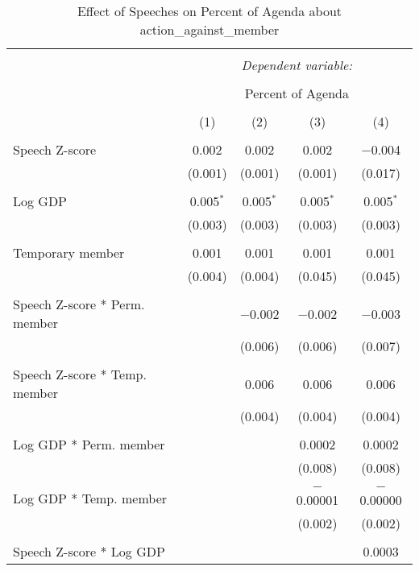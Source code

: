 
\begin{table}[!htbp] \centering 
  \caption{Effect of Speeches on Percent of Agenda about action_against_member} 
  \label{} 
\begin{tabular}{@{\extracolsep{5pt}}lcccc} 
\\[-1.8ex]\hline 
\hline \\[-1.8ex] 
 & \multicolumn{4}{c}{\textit{Dependent variable:}} \\ 
\cline{2-5} 
\\[-1.8ex] & \multicolumn{4}{c}{Percent of Agenda} \\ 
\\[-1.8ex] & (1) & (2) & (3) & (4)\\ 
\hline \\[-1.8ex] 
 Speech Z-score & 0.002 & 0.002 & 0.002 & $-$0.004 \\ 
  & (0.001) & (0.001) & (0.001) & (0.017) \\ 
  & & & & \\ 
 Log GDP & 0.005$^{*}$ & 0.005$^{*}$ & 0.005$^{*}$ & 0.005$^{*}$ \\ 
  & (0.003) & (0.003) & (0.003) & (0.003) \\ 
  & & & & \\ 
 Temporary member & 0.001 & 0.001 & 0.001 & 0.001 \\ 
  & (0.004) & (0.004) & (0.045) & (0.045) \\ 
  & & & & \\ 
 Speech Z-score * Perm. member &  & $-$0.002 & $-$0.002 & $-$0.003 \\ 
  &  & (0.006) & (0.006) & (0.007) \\ 
  & & & & \\ 
 Speech Z-score * Temp. member &  & 0.006 & 0.006 & 0.006 \\ 
  &  & (0.004) & (0.004) & (0.004) \\ 
  & & & & \\ 
 Log GDP * Perm. member &  &  & 0.0002 & 0.0002 \\ 
  &  &  & (0.008) & (0.008) \\ 
  & & & & \\ 
 Log GDP * Temp. member &  &  & $-$0.00001 & $-$0.00000 \\ 
  &  &  & (0.002) & (0.002) \\ 
  & & & & \\ 
 Speech Z-score * Log GDP &  &  &  & 0.0003 \\ 

\end{tabular}
\end{table}
